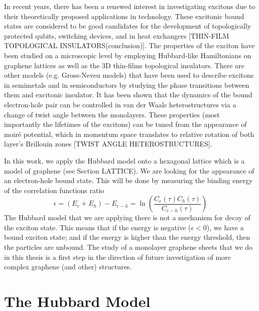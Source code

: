 In recent years, there has been a renewed interest in investigating excitons due to their theoretically proposed applications in technology. These excitonic bound states are considered to be good candidates for the development of topologically protected qubits, switching devices, and in heat exchangers [THIN-FILM TOPOLOGICAL INSULATORS(conclusion)]. The properties of the exciton have been studied on a microscopic level by employing Hubbard-like Hamiltonians on graphene lattices as well as the 3D thin-films topological insulators. There are other models (e.g. Gross-Neveu models) that have been used to describe excitons in semimetals and in semiconductors by studying the phase transitions between them and excitonic insulator. It has been shown that the dynamics of the bound electron-hole pair can be controlled in van der Waals heterostructures via a change of twist angle between the monolayers. These properties (most importantly the lifetimes of the excitons) can be tuned from the appearance of moiré potential, which in momentum space translates to relative rotation of both layer's Brillouin zones [TWIST ANGLE HETEROSTRUCTURES].

In this work, we apply the Hubbard model onto a hexagonal lattice which is a model of graphene (see Section LATTICE). We are looking for the appearance of an electron-hole bound state. This will be done by measuring the binding energy of the correlation functions ratio
\begin{equation}
    \epsilon = (E_e + E_h) - E_{e-h} = \ln\left( \frac{C_e(\tau)C_h(\tau)}{C_{e-h}(\tau)} \right)
\end{equation}
The Hubbard model that we are applying there is not a mechanism for decay of the exciton state. This means that if the energy is negative ($\epsilon < 0$), we have a bound exciton state; and if the energy is higher than the energy threshold, then the particles are unbound. The study of a monolayer graphene sheets that we do in this thesis is a first step in the direction of future investigation of more complex graphene (and other) structures.


\section{The Hubbard Model}